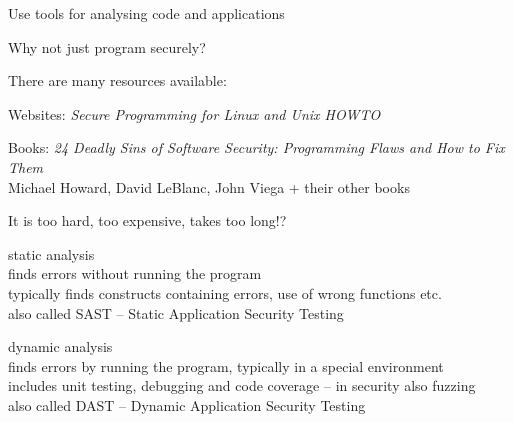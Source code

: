 \documentclass[Screen16to9,17pt]{foils}
\begin{document}


\centerline{Use tools for analysing code and applications}


\begin{list1}
\item Why not just program securely?
\item There are many resources available:
\item Websites: \emph{Secure Programming for Linux and Unix HOWTO}\\
\item Books: \emph{24 Deadly Sins of Software Security: Programming Flaws and How to Fix Them}\\
Michael Howard, David LeBlanc, John Viega + their other books
\end{list1}

\vskip 2cm
\centerline{\Large It is too hard, too expensive, takes too long!?}





\begin{list1}
\item {\Large static analysis}\\
finds errors without running the program\\
typically finds constructs containing errors, use of wrong functions etc.\\
also called SAST -- Static Application Security Testing
\item {\Large dynamic analysis}\\
finds errors by running the program, typically in a special environment\\
includes unit testing, debugging and code coverage -- in security also fuzzing\\
also called DAST -- Dynamic Application Security Testing
\end{list1}
\end{document}
